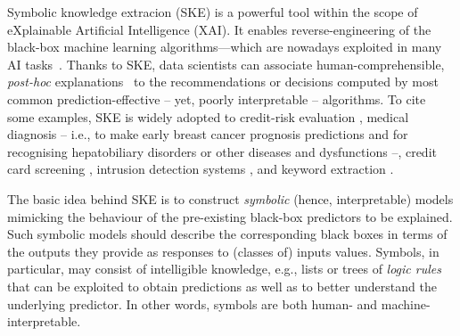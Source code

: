 \documentclass[
]{ceurart}
\begin{document}
Symbolic knowledge extracion (SKE) is a powerful tool within the scope of eXplainable Artificial Intelligence (XAI).
%
It enables reverse-engineering of the black-box machine learning algorithms---which are nowadays exploited in many AI tasks~\cite{rocha2012far}.
%
Thanks to SKE, data scientists can associate human-comprehensible, \emph{post-hoc} explanations~\cite{KENNY2021103459} to the recommendations or decisions computed by most common prediction-effective -- yet, poorly interpretable -- algorithms.
%
To cite some examples, SKE is widely adopted to credit-risk evaluation \cite{baesens2003using,baesens2001building,steiner2006using}, medical diagnosis -- i.e., to make early breast cancer prognosis predictions \cite{franco2007early} and for recognising hepatobiliary disorders \cite{hayashi2000comparison} or other diseases and dysfunctions \cite{bologna1997three} --, credit card screening \cite{setiono2011rule}, intrusion detection systems \cite{hofmann2003rule}, and keyword extraction \cite{azcarraga2012keyword}.

The basic idea behind SKE is to construct \emph{symbolic} (hence, interpretable) models mimicking the behaviour of the pre-existing black-box predictors to be explained.
%
Such symbolic models should describe the corresponding black boxes in terms of the outputs they provide as responses to (classes of) inputs values.
%
Symbols, in particular, may consist of intelligible knowledge, e.g., lists or trees of \emph{logic rules} that can be exploited to obtain predictions as well as to better understand the underlying predictor.
%
In other words, symbols are both human- and machine-interpretable.
\end{document}
